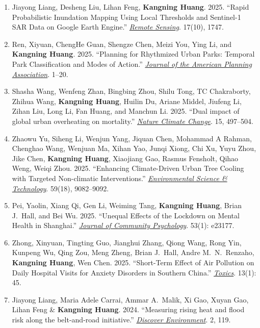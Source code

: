 \documentclass[11pt,letterpaper]{article}
\begin{document}
\begin{enumerate}
  \item Jiayong Liang, Desheng Liu, Lihan Feng, \textbf{Kangning Huang}. 2025. ``Rapid Probabilistic Inundation Mapping Using Local Thresholds and Sentinel-1 SAR Data on Google Earth Engine.'' \href{https://www.mdpi.com/2072-4292/17/10/1747}{\textit{Remote Sensing}}. 17(10), 1747.

  \item Ren, Xiyuan, ChengHe Guan, Shengze Chen, Meizi You, Ying Li, and \textbf{Kangning Huang}. 2025. ``Planning for Rhythmized Urban Parks: Temporal Park Classification and Modes of Action.'' \href{https://www.tandfonline.com/doi/full/10.1080/01944363.2025.2523604}{\textit{Journal of the American Planning Association}}. 1--20.

  \item Shasha Wang, Wenfeng Zhan, Bingbing Zhou, Shilu Tong, TC Chakraborty, Zhihua Wang, \textbf{Kangning Huang}, Huilin Du, Ariane Middel, Jiufeng Li, Zihan Liu, Long Li, Fan Huang, and Manchun Li. 2025. ``Dual impact of global urban overheating on mortality.'' \href{https://www.nature.com/articles/s41558-025-02303-3}{\textit{Nature Climate Change}}. 15, 497--504.

  \item Zhaowu Yu, Siheng Li, Wenjun Yang, Jiquan Chen, Mohammad A Rahman, Chenghao Wang, Wenjuan Ma, Xihan Yao, Junqi Xiong, Chi Xu, Yuyu Zhou, Jike Chen, \textbf{Kangning Huang}, Xiaojiang Gao, Rasmus Fensholt, Qihao Weng, Weiqi Zhou. 2025. ``Enhancing Climate-Driven Urban Tree Cooling with Targeted Non-climatic Interventions.'' \href{https://pubs.acs.org/doi/10.1021/acs.est.4c14275}{\textit{Environmental Science \& Technology}}. 59(18), 9082--9092.

  \item Pei, Yaolin, Xiang Qi, Gen Li, Weiming Tang, \textbf{Kangning Huang}, Brian J.\ Hall, and Bei Wu. 2025. ``Unequal Effects of the Lockdown on Mental Health in Shanghai.'' \href{https://onlinelibrary.wiley.com/doi/10.1002/jcop.23177}{\textit{Journal of Community Psychology}}. 53(1): e23177.

  \item Zhong, Xinyuan, Tingting Guo, Jianghui Zhang, Qiong Wang, Rong Yin, Kunpeng Wu, Qing Zou, Meng Zheng, Brian J.\ Hall, Andre M.\ N.\ Renzaho, \textbf{Kangning Huang}, Wen Chen. 2025. ``Short-Term Effect of Air Pollution on Daily Hospital Visits for Anxiety Disorders in Southern China.'' \href{https://www.mdpi.com/2305-6304/13/1/45}{\textit{Toxics}}. 13(1): 45.

  \item Jiayong Liang, Maria Adele Carrai, Ammar A.\ Malik, Xi Gao, Xuyan Gao, Lihan Feng \& \textbf{Kangning Huang}. 2024. ``Measuring rising heat and flood risk along the belt-and-road initiative.'' \href{https://doi.org/10.1007/s44274-024-00148-9}{\textit{Discover Environment}}. 2, 119.


\end{enumerate}
\end{document}

